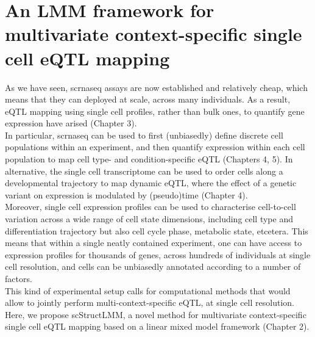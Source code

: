 
\chapter{An LMM framework for multivariate context-specific single cell eQTL mapping}
\label{chapter6}

As we have seen, \gls{scrnaseq} assays are now established and relatively cheap, which means that they can deployed at scale, across many individuals. 
As a result, eQTL mapping using single cell profiles, rather than bulk ones, to quantify gene expression have arised (Chapter 
3).\\

In particular, \gls{scrnaseq} can be used to first (unbiasedly) define discrete cell populations within an experiment, and then quantify expression within each cell population to map cell type- and condition-specific eQTL (Chapters 
4, 5).
In alternative, the single cell transcriptome can be used to order cells along a developmental trajectory to map dynamic eQTL, where the effect of a genetic variant on expression is modulated by (pseudo)time (Chapter 
4). \\


Moreover, single cell expression profiles can be used to characterise cell-to-cell variation across a wide range of cell state dimensions,
including cell type and differentiation trajectory but also cell cycle phase, metabolic state, etcetera.
This means that within a single neatly contained experiment, one can have access to expression profiles for thousands of genes, across hundreds of individuals at single cell resolution, and cells can be unbiasedly annotated according to a number of factors. \\

This kind of experimental setup calls for computational methods that would allow to jointly perform multi-context-specific eQTL, at single cell resolution.
Here, we propose scStructLMM, a novel method for multivariate context-specific single cell eQTL mapping based on a linear mixed model framework (Chapter 
2).

